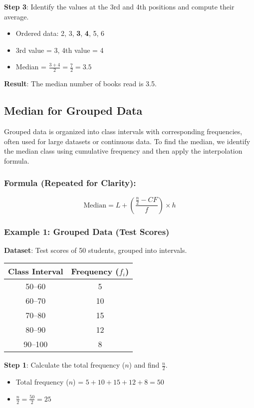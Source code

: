 \documentclass[11pt]{article}
\begin{document}
\textbf{Step 3}: Identify the values at the 3rd and 4th positions and compute their average.
\begin{itemize}
    \item Ordered data: 2, 3, \textbf{3}, \textbf{4}, 5, 6
    \item 3rd value = 3, 4th value = 4
    \item Median = $\frac{3 + 4}{2} = \frac{7}{2} = 3.5$
\end{itemize}

\textbf{Result}: The median number of books read is 3.5.

\subsection{Median for Grouped Data}

Grouped data is organized into class intervals with corresponding frequencies, often used for large datasets or continuous data. To find the median, we identify the median class using cumulative frequency and then apply the interpolation formula.

\subsubsection*{Formula (Repeated for Clarity):}
\[
\text{Median} = L + \left( \frac{\frac{n}{2} - CF}{f} \right) \times h
\]

\subsubsection*{Example 1: Grouped Data (Test Scores)}
\textbf{Dataset}: Test scores of 50 students, grouped into intervals.

\begin{center}
\begin{tabular}{|c|c|}
\hline
\textbf{Class Interval} & \textbf{Frequency} ($f_i$) \\
\hline
50--60 & 5 \\
60--70 & 10 \\
70--80 & 15 \\
80--90 & 12 \\
90--100 & 8 \\
\hline
\end{tabular}
\end{center}

\textbf{Step 1}: Calculate the total frequency ($n$) and find $\frac{n}{2}$.
\begin{itemize}
    \item Total frequency ($n$) = $5 + 10 + 15 + 12 + 8 = 50$
    \item $\frac{n}{2} = \frac{50}{2} = 25$
\end{itemize}
\end{document}
